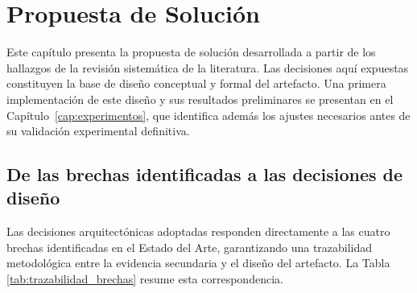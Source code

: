 \chapter{Propuesta de Solución}
\label{cap:propuesta}
Este capítulo presenta la propuesta de solución desarrollada a partir de los hallazgos de la revisión sistemática de la literatura. Las decisiones aquí expuestas constituyen la base de diseño conceptual y formal del artefacto. Una primera implementación de este diseño y sus resultados preliminares se presentan en el Capítulo~\ref{cap:experimentos}, que identifica además los ajustes necesarios antes de su validación experimental definitiva.

\section{De las brechas identificadas a las decisiones de diseño}
Las decisiones arquitectónicas adoptadas responden directamente a las cuatro brechas identificadas en el Estado del Arte, garantizando una trazabilidad metodológica entre la evidencia secundaria y el diseño del artefacto. La Tabla \ref{tab:trazabilidad_brechas} resume esta correspondencia.

